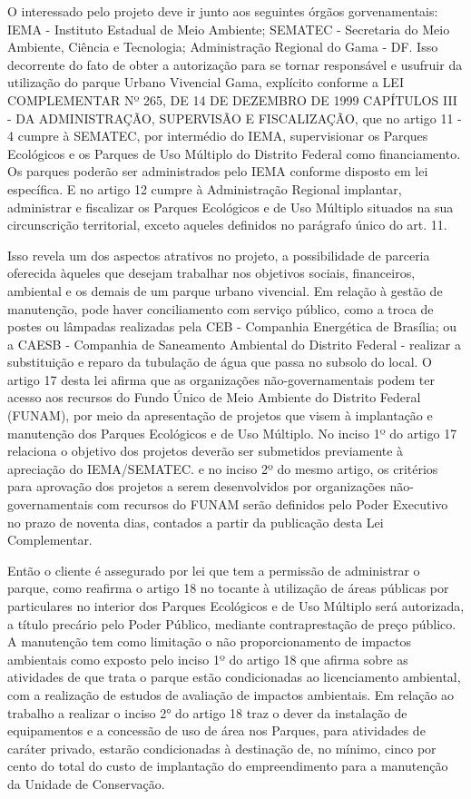     O interessado pelo projeto deve ir junto aos seguintes órgãos gorvenamentais: IEMA - Instituto Estadual de Meio Ambiente; SEMATEC - Secretaria do Meio Ambiente, Ciência e Tecnologia; Administração Regional do Gama - DF. Isso decorrente do fato de obter a autorização para se tornar responsável e usufruir da utilização do parque Urbano Vivencial Gama, explícito conforme a LEI COMPLEMENTAR Nº 265, DE 14 DE DEZEMBRO DE 1999 CAPÍTULOS III - DA ADMINISTRAÇÃO, SUPERVISÃO E FISCALIZAÇÃO, que no artigo 11 - 4 cumpre à SEMATEC, por intermédio do IEMA, supervisionar os Parques Ecológicos e os Parques de Uso Múltiplo do Distrito Federal como financiamento. Os parques poderão ser administrados pelo IEMA conforme disposto em lei específica. E no artigo 12 cumpre à Administração Regional implantar, administrar e fiscalizar os Parques Ecológicos e de Uso Múltiplo situados na sua circunscrição territorial, exceto aqueles definidos no parágrafo único do art. 11.
    
	Isso revela um dos aspectos atrativos no projeto, a possibilidade de parceria oferecida àqueles que desejam trabalhar nos objetivos sociais, financeiros, ambiental e os demais de um parque urbano vivencial. Em relação à gestão de manutenção, pode haver conciliamento com serviço público, como a troca de postes ou lâmpadas realizadas pela CEB - Companhia Energética de Brasília; ou a CAESB - Companhia de Saneamento Ambiental do Distrito Federal - realizar a substituição e reparo da tubulação de água que passa no subsolo do local. O artigo 17 desta lei afirma que as organizações não-governamentais podem ter acesso aos recursos do Fundo Único de Meio Ambiente do Distrito Federal (FUNAM), por meio da apresentação de projetos que visem à implantação e manutenção dos Parques Ecológicos e de Uso Múltiplo. No inciso 1º do artigo 17 relaciona o objetivo dos projetos deverão ser submetidos previamente à apreciação do IEMA/SEMATEC. e no inciso 2º do mesmo artigo, os critérios para aprovação dos projetos a serem desenvolvidos por organizações não-governamentais com recursos do FUNAM serão definidos pelo Poder Executivo no prazo de noventa dias, contados a partir da publicação desta Lei Complementar.
	
	Então o cliente é assegurado por lei que tem a permissão de administrar o parque, como reafirma o artigo 18 no tocante à utilização de áreas públicas por particulares no interior dos Parques Ecológicos e de Uso Múltiplo será autorizada, a título precário pelo Poder Público, mediante contraprestação de preço público. A manutenção tem como limitação o não proporcionamento de impactos ambientais como exposto pelo inciso 1º do artigo 18 que afirma sobre as atividades de que trata o parque estão condicionadas ao licenciamento ambiental, com a realização de estudos de avaliação de impactos ambientais. Em relação ao trabalho a realizar o inciso 2° do artigo 18 traz o dever da instalação de equipamentos e a concessão de uso de área nos Parques, para atividades de caráter privado, estarão condicionadas à destinação de, no mínimo, cinco por cento do total do custo de implantação do empreendimento para a manutenção da Unidade de Conservação.
	
